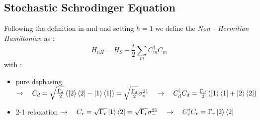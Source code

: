\documentclass[a4paper,12pt]{article}
\begin{document}
	\subsection{Stochastic Schrodinger Equation}
	
	Following the definition in \cite{molmerMonteCarloWavefunction1993a} and \cite{cocciaProbingQuantumCoherence2018} and setting $ \hbar = 1 $ we define the \textit{Non - Hermitian Hamiltonian} as : 
	\begin{equation}
		H_{nH} = H_{S} - \frac{i}{2} \sum_{m}{C_{m}^{\dagger} C_{m}} 
	\end{equation}
	with :
	\begin{itemize}
		\item pure dephasing $ \rightarrow \quad C_{d} = \sqrt{\frac{\Gamma_{d}}{2}} \left( \ket{2}\bra{2} - \ket{1}\bra{1} \right) = \sqrt{\frac{\Gamma_{d}}{2}} \sigma_{z}^{21} \quad \rightarrow \quad C_{d}^{\dagger} C_{d} = \frac{\Gamma_{d}}{2} \left( \ket{1}\bra{1} + \ket{2}\bra{2} \right) $
		\item 2-1 relaxation $ \rightarrow \quad C_{r} = \sqrt{\Gamma_{r}} \ket{1}\bra{2} = \sqrt{\Gamma_{r}} \sigma_{-}^{21} \quad \rightarrow \quad C_{r}^{\dagger} C_{r} = \Gamma_{r} \ket{2}\bra{2} $
	\end{itemize}
		
\end{document}
